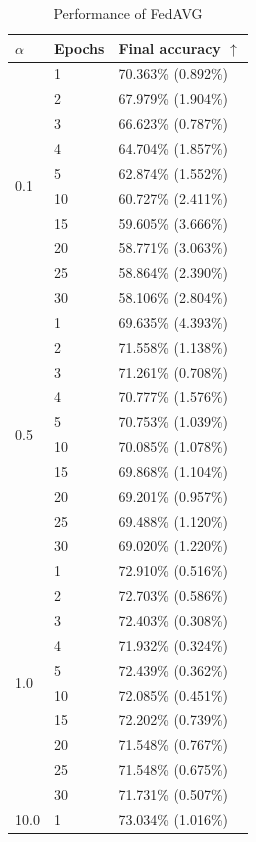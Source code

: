 \documentclass[conference,compsoc]{IEEEtran}
\begin{document}
\begin{table}[ht]
\centering
\caption{Performance of FedAVG}
    \centering
    \begin{tabular}{lll}
    \hline
    \textbf{$\alpha$} & \textbf{Epochs} & \textbf{Final accuracy $\uparrow$} \\
    \hline
    \multirow{10}{*}{0.1} & 1 & 70.363\% (0.892\%) \\
    & 2 & 67.979\% (1.904\%) \\
    & 3 & 66.623\% (0.787\%) \\
    & 4 & 64.704\% (1.857\%) \\
    & 5 & 62.874\% (1.552\%) \\
    & 10 & 60.727\% (2.411\%) \\
    & 15 & 59.605\% (3.666\%) \\
    & 20 & 58.771\% (3.063\%) \\
    & 25 & 58.864\% (2.390\%) \\
    & 30 & 58.106\% (2.804\%) \\
    \hline
    \multirow{10}{*}{0.5} & 1 & 69.635\% (4.393\%) \\
    & 2 & 71.558\% (1.138\%) \\
    & 3 & 71.261\% (0.708\%) \\
    & 4 & 70.777\% (1.576\%) \\
    & 5 & 70.753\% (1.039\%) \\
    & 10 & 70.085\% (1.078\%) \\
    & 15 & 69.868\% (1.104\%) \\
    & 20 & 69.201\% (0.957\%) \\
    & 25 & 69.488\% (1.120\%) \\
    & 30 & 69.020\% (1.220\%) \\
    \hline
    \multirow{10}{*}{1.0} & 1 & 72.910\% (0.516\%) \\
    & 2 & 72.703\% (0.586\%) \\
    & 3 & 72.403\% (0.308\%) \\
    & 4 & 71.932\% (0.324\%) \\
    & 5 & 72.439\% (0.362\%) \\
    & 10 & 72.085\% (0.451\%) \\
    & 15 & 72.202\% (0.739\%) \\
    & 20 & 71.548\% (0.767\%) \\
    & 25 & 71.548\% (0.675\%) \\
    & 30 & 71.731\% (0.507\%) \\
    \hline
    \multirow{10}{*}{10.0} & 1 & 73.034\% (1.016\%) \\

\end{tabular}
\end{table}
\end{document}
